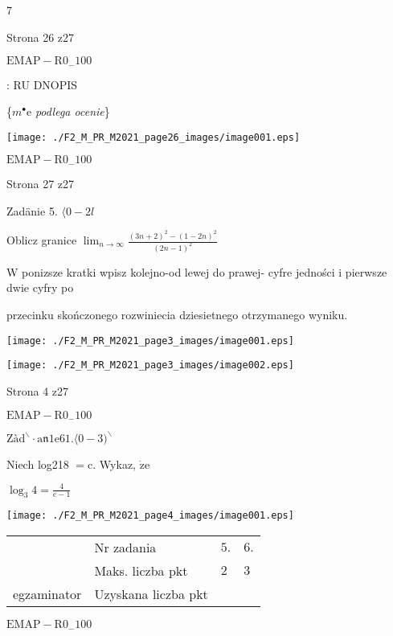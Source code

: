\documentclass[a4paper,12pt]{article}
\begin{document}
7

Strona 26 z27

$\mathrm{E}\mathrm{M}\mathrm{A}\mathrm{P}-\mathrm{R}0_{-}100$





: RU DNOPIS

\{$m^{\bullet}\mathrm{e}$ {\it podlega ocenie}\}
\begin{center}
\texttt{[image: ./F2\_M\_PR\_M2021\_page26\_images/image001.eps]}
\end{center}
$\mathrm{E}\mathrm{M}\mathrm{A}\mathrm{P}-\mathrm{R}0_{-}100$

Strona 27 z27










Zadänie 5. $\langle 0-2l$

Oblicz granice $\displaystyle \lim_{n\rightarrow\infty}\frac{(3n+2)^{2}-(1-2n)^{2}}{(2n-1)^{2}}$

W ponizsze kratki wpisz kolejno-od lewej do prawej- cyfre jedności i pierwsze dwie cyfry po

przecinku skończonego rozwiniecia dziesietnego otrzymanego wyniku.
\begin{center}
\texttt{[image: ./F2\_M\_PR\_M2021\_page3\_images/image001.eps]}

\texttt{[image: ./F2\_M\_PR\_M2021\_page3\_images/image002.eps]}
\end{center}
Strona 4 z27

$\mathrm{E}\mathrm{M}\mathrm{A}\mathrm{P}-\mathrm{R}0_{-}100$





$\mathrm{Z}\text{à} \mathrm{d}^{\backslash }\cdot \mathrm{a}\mathfrak{n}1\mathrm{e}61. \langle 0-3)^{\backslash }$

Niech log218 $= \mathrm{c}$. Wykaz, $\dot{\mathrm{z}}\mathrm{e}$

$\log_{3}4 =\displaystyle \frac{4}{\mathrm{c}-1}$
\begin{center}
\texttt{[image: ./F2\_M\_PR\_M2021\_page4\_images/image001.eps]}

\begin{tabular}{|l|l|l|l|}
\cline{2-4}
&	\multicolumn{1}{|l|}{Nr zadania}&	\multicolumn{1}{|l|}{$5.$}&	\multicolumn{1}{|l|}{ $6.$}	\\
\cline{2-4}
&	\multicolumn{1}{|l|}{Maks. liczba pkt}&	\multicolumn{1}{|l|}{$2$}&	\multicolumn{1}{|l|}{ $3$}	\\
\cline{2-4}
\multicolumn{1}{|l|}{egzaminator}&	\multicolumn{1}{|l|}{Uzyskana liczba pkt}&	\multicolumn{1}{|l|}{}&	\multicolumn{1}{|l|}{}	\\
\hline
\end{tabular}

\end{center}
$\mathrm{E}\mathrm{M}\mathrm{A}\mathrm{P}-\mathrm{R}0_{-}100$
\end{document}

